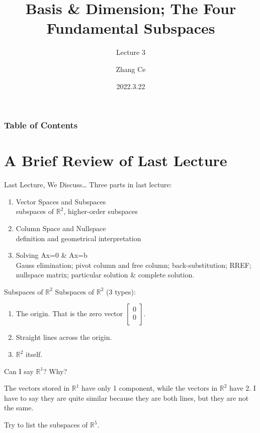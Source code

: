 \documentclass{beamer}
\title[Linear Algebra] %
{Basis \& Dimension; The Four Fundamental Subspaces}
\subtitle{Lecture 3}
\author[11910803@mail.sustech.edu.cn] %
{
    Zhang Ce
}
\institute[] %
{
    Department of Electrical and Electronic Engineering\\
    Southern University of Science and Technology
}
\date[2022.3.22] %
{2022.3.22}
\begin{document}
\frame{\titlepage}


\begin{frame}
\frametitle{Table of Contents}
\tableofcontents
\end{frame}
\section{A Brief Review of Last Lecture}
\begin{frame}{Last Lecture, We Discuss\dots}
Three parts in last lecture:
    \begin{enumerate}
        \item Vector Spaces and Subspaces\\
        subspaces of $\mathbb{R}^2$, higher-order subspaces
        \item Column Space and Nullspace\\
        definition and geometrical interpretation
        \item Solving Ax=0 \& Ax=b\\
        Gauss elimination; pivot column and free column; back-substitution; RREF; nullspace matrix; particular solution \& complete solution.
    \end{enumerate}
\end{frame}

\begin{frame}{Subspaces of $\mathbb{R} ^2$}
    Subspaces of $\mathbb{R} ^2$ (3 types):
    \begin{enumerate}
        \item The origin. That is the zero vector $\left[ \begin{array}{c}
            0\\
            0\\
        \end{array} \right] $.
        \item Straight lines across the origin.
        \vspace{7pt}
        \item  $\mathbb{R} ^2$ itself.
    \end{enumerate}
    
    \vspace{5pt}
    Can I say $\mathbb{R} ^1$? Why?
    
    \vspace{3pt}
    The vectors stored in $\mathbb{R} ^1$ have only 1 component, while the vectors in $\mathbb{R} ^2$ have 2. I have to say they are quite similar because they are both lines, but they are not the same.
    
    \vspace{3pt}
    Try to list the subspaces of $\mathbb{R} ^5$.
\end{frame}
\end{document}
